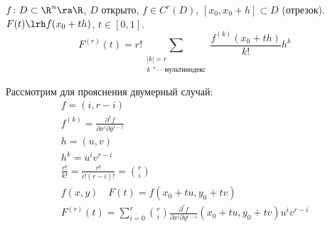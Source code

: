\begin{lemma}
	$f\colon D \subset \R^n \ra \R$, $D$ открыто, $f \in C^r(D)$, $[x_0, x_0 + h] \subset D$ (отрезок).
	$F(t) \lrh f(x_0 + th)$, $t \in [0,1]$.
	\[ F^{(r)}(t) = r! \sum_{\substack{|k| = r \\ \text{$k$ "--- мультииндекс}}} \frac{f^{(k)}(x_0 + th)}{k!} h^k \]
\end{lemma}
\begin{Rem}
	Рассмотрим для прояснения двумерный случай:
	\begin{gather*}
		f = (i, r - i) \\
		f^{(k)} = \frac{\partial^r f}{\partial x^i \partial y^{r-i}} \\
		h = (u, v) \\
		h^k = u^i v^{r-i} \\
		\frac{r!}{k!} = \frac{r!}{i! (r-i)!} = \binom{r}{i} \\
		f(x, y) \quad F(t) = f(x_0 + tu, y_0 + tv) \\
		F^{(r)} (t) = \sum_{i = 0}^r \binom{r}{i} \frac{\partial^r f}{\partial x^i \partial y^{r-i}} (x_0 + tu, y_0 + tv) u^i v^{r-i}
	\end{gather*}
\end{Rem}
